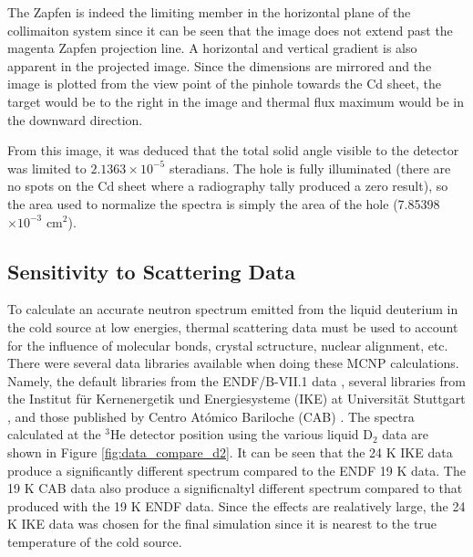 \documentclass[5p,12pt]{elsarticle}
\begin{document}
The Zapfen is indeed the limiting member in the horizontal plane of the collimaiton system since it can be seen that the image does not extend past the magenta Zapfen projection line.  A horizontal and vertical gradient is also apparent in the projected image.  Since the dimensions are mirrored and the image is plotted from the view point of the pinhole towards the Cd sheet, the target would be to the right in the image and thermal flux maximum would be in the downward direction.

From this image, it was deduced that the total solid angle visible to the detector was limited to $2.1363\times10^{-5}$ steradians.  The hole is fully illuminated (there are no spots on the Cd sheet where a radiography tally produced a zero result), so the area used to normalize the spectra is simply the area of the hole (7.85398$\times 10^{-3}$ cm$^2$).

%
%
%
%
%

\subsection{Sensitivity to Scattering Data}
\label{subsec:data}

To calculate an accurate neutron spectrum emitted from the liquid deuterium in the cold source at low energies, thermal scattering data must be used to account for the influence of molecular bonds, crystal sctructure, nuclear alignment, etc.   There were several data libraries available when doing these MCNP calculations.  Namely, the default libraries from the ENDF/B-VII.1 data \cite{mcnp6}, several libraries from the Institut f\"{u}r Kernenergetik und Energiesysteme (IKE) at Universit\"{a}t Stuttgart \cite{IKE}, and those published by Centro At\'{o}mico Bariloche (CAB) \cite{granada_d2}.  The spectra calculated at the $^3$He detector position using the various liquid D$_2$ data are shown in Figure \ref{fig:data_compare_d2}.  It can be seen that the 24 K IKE data produce a significantly different spectrum compared to the ENDF 19 K data.  The 19 K CAB data also produce a significnaltyl different spectrum compared to that produced with the 19 K ENDF data.  Since the effects are realatively large, the 24 K IKE data was chosen for the final simulation since it is nearest to the true temperature of the cold source.
\end{document}
